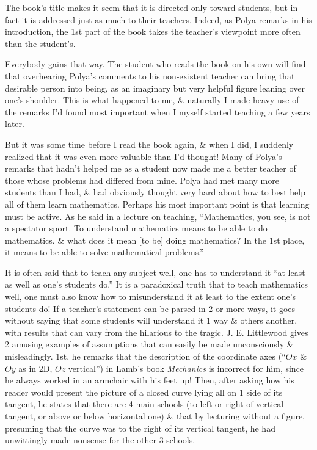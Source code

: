 \documentclass{article}
\begin{document}
\begin{enumerate}
\begin{itemize}
		The book's title makes it seem that it is directed only toward students, but in fact it is addressed just as much to their teachers. Indeed, as {\sc Polya} remarks in his introduction, the 1st part of the book takes the teacher's viewpoint more often than the student's.

		Everybody gains that way. The student who reads the book on his own will find that overhearing {\sc Polya}'s comments to his non-existent teacher can bring that desirable person into being, as an imaginary but very helpful figure leaning over one's shoulder. This is what happened to me, \& naturally I made heavy use of the remarks I'd found most important when I myself started teaching a few years later.

		But it was some time before I read the book again, \& when I did, I suddenly realized that it was even more valuable than I'd thought! Many of {\sc Polya}'s remarks that hadn't helped me as a student now made me a better teacher of those whose problems had differed from mine. {\sc Polya} had met many more students than I had, \& had obviously thought very hard about how to best help all of them learn mathematics. Perhaps his most important point is that learning must be active. As he said in a lecture on teaching, ``Mathematics, you see, is not a spectator sport. To understand mathematics means to be able to do mathematics. \& what does it mean [to be] doing mathematics? In the 1st place, it means to be able to solve mathematical problems.''

		It is often said that to teach any subject well, one has to understand it ``at least as well as one's students do.'' It is a paradoxical truth that to teach mathematics well, one must also know how to misunderstand it at least to the extent one's students do! If a teacher's statement can be parsed in 2 or more ways, it goes without saying that some students will understand it 1 way \& others another, with results that can vary from the hilarious to the tragic. {\sc J. E. Littlewood} gives 2 amusing examples of assumptions that can easily be made unconsciously \& misleadingly. 1st, he remarks that the description of the coordinate axes (``$Ox$ \& $Oy$ as in 2D, $Oz$ vertical'') in {\sc Lamb}'s book {\it Mechanics} is incorrect for him, since he always worked in an armchair with his feet up! Then, after asking how his reader would present the picture of a closed curve lying all on 1 side of its tangent, he states that there are 4 main schools (to left or right of vertical tangent, or above or below horizontal one) \& that by lecturing without a figure, presuming that the curve was to the right of its vertical tangent, he had unwittingly made nonsense for the other 3 schools.


\end{itemize}
\end{enumerate}
\end{document}
